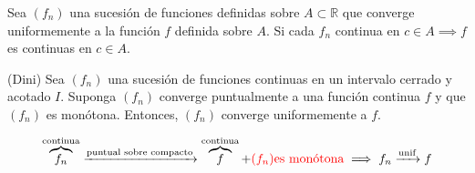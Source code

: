 \begin{teorema}
	Sea $(f_n)$ una sucesión de funciones definidas sobre $A\subset \mathbb{R}$ que converge uniformemente a la función $f$ definida sobre $A$. Si cada $f_n$ continua en $c\in A\implies f$ es continuas en $c\in A$. 
\end{teorema}

\begin{teorema}(Dini)
	Sea $(f_n)$ una sucesión de funciones continuas en un intervalo cerrado y acotado $I$. Suponga $(f_n)$ converge puntualmente a una función continua $f$ y que $(f_n)$ es monótona. Entonces, $(f_n)$ converge uniformemente a $f$. 
	
	$$\overbrace{f_n}^{\text{continua}}\xrightarrow{\text{puntual sobre compacto}}\overbrace{f}^{\text{continua}}+\textcolor{red}{(f_n)\text{es monótona}}\implies f_n\xrightarrow{\text{unif}}f$$

\end{teorema}

